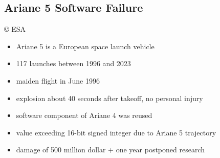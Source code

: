 \subsection{Ariane 5 Software Failure} %
\begin{frame}{\insertsubsection}
	\begin{fancycolumns}[widths={35}]
	\nextcolumn
		\centering{} {\tiny\copyright{} ESA} %
		\begin{definition}{\insertsubsection{}}
			\begin{itemize}
				\item Ariane 5 is a European space launch vehicle
				\item 117 launches between 1996 and 2023
				\item maiden flight in June 1996
				\item explosion about 40 seconds after takeoff, no personal injury
				\item software component of Ariane 4 was reused
				\item value exceeding 16-bit signed integer due to Ariane 5 trajectory
				\item damage of 500 million dollar + one year postponed research
			\end{itemize}
		\end{definition}
	\end{fancycolumns}
\end{frame}

